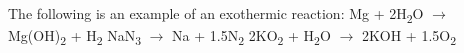 \documentclass[12pt]{article}
\begin{document}
The following is an example
\newline
of an exothermic reaction:
\newline
Mg + 2H\textsubscript{2}O $\rightarrow $ Mg(OH)\textsubscript{2 }+ H\textsubscript{2}
\newline
NaN\textsubscript{3 }$\rightarrow $ Na + 1.5N\textsubscript{2}
\newline
2KO\textsubscript{2 }+ H\textsubscript{2}O $\rightarrow $ 2KOH + 1.5O\textsubscript{2}
\end{document}

